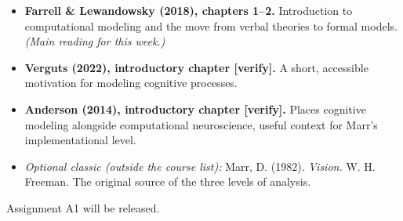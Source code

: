 \begin{itemize}
\tightlist
\item
  \textbf{Farrell \& Lewandowsky (2018), chapters 1--2.} Introduction to
  computational modeling and the move from verbal theories to formal
  models. \emph{(Main reading for this week.)}
\item
  \textbf{Verguts (2022), introductory chapter {[}verify{]}.} A short,
  accessible motivation for modeling cognitive processes.
\item
  \textbf{Anderson (2014), introductory chapter {[}verify{]}.} Places
  cognitive modeling alongside computational neuroscience, useful
  context for Marr's implementational level.
\item
  \emph{Optional classic (outside the course list):} Marr, D. (1982).
  \emph{Vision.} W. H. Freeman. The original source of the three levels
  of analysis.
\end{itemize}

Assignment A1 will be released.
